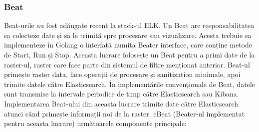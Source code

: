 \documentclass[a4paper, 12pt, twoside]{report}
\begin{document}
			\subsubsection{Beat}
Beat-urile au fost adăugate recent la stack-ul ELK. Un Beat are responsabilitatea sa colecteze date și sa le trimită spre procesare sau vizualizare. Acesta trebuie sa implementeze în Golang o interfață numita Beater interface, care conține metode de Start, Run și Stop. Aceasta lucrare folosește un Beat pentru a primi date de la raster-ul, raster care face parte din sistemul de filtre menționat anterior. Beat-ul primește raster data, face operații de procesare și sanitization minimale, apoi trimite datele către Elasticsearch. În  implementările convenționale de Beat, datele sunt transmise la intervale periodice de timp către Elasticsearch sau Kibana. Implementarea Beat-ului din aceasta lucrare trimite date către Elasticsearch atunci când primește informații noi de la raster. cBeat (Beater-ul implementat pentru aceasta lucrare) următoarele componente principale:
\end{document}
